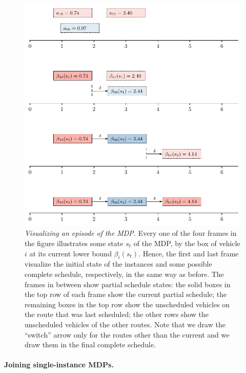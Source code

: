 \documentclass[a4paper]{report}
\theoremstyle{definition}
\theoremstyle{plain}
\begin{document}
\begin{figure}
  \centering
  \includegraphics[scale=1]{../single/figures/episode.pdf}
  \caption{\emph{Visualizing an episode of the MDP.} Every one of the four frames in
    the figure illustrates some state $s_t$ of the MDP, by the box of vehicle
    $i$ at its current lower bound $\beta_i(s_t)$.
    Hence, the first and last frame visualize the initial state of the instances
    and some possible complete schedule, respectively, in the same way as
    before. The frames in between show partial schedule states: the solid boxes
    in the top row of each frame show the current partial schedule; the
    remaining boxes in the top row show the unscheduled vehicles on the route
    that was last scheduled; the other rows show the unscheduled vehicles of the
    other routes. Note that we draw the ``switch'' arrow only for the routes other
    than the current and we draw them in the final complete
    schedule.}\label{fig:mdp-episode} \end{figure}



\paragraph{Joining single-instance MDPs.}
\end{document}
